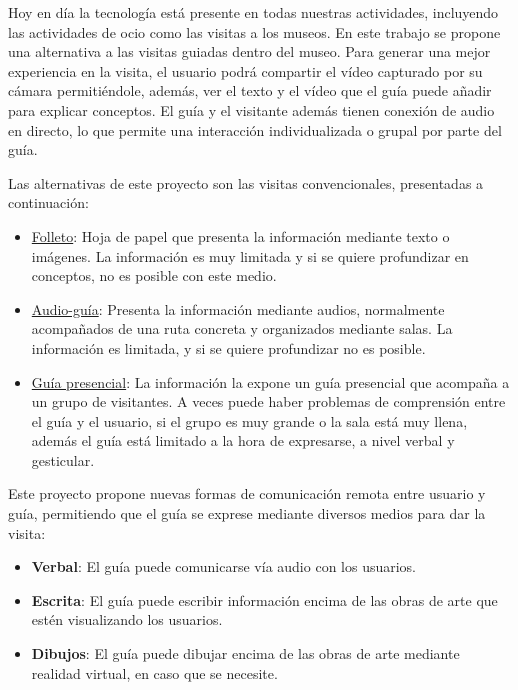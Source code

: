 

Hoy en día la tecnología está presente en todas nuestras actividades, incluyendo las actividades de ocio como las visitas a los museos. En este trabajo se propone una alternativa a las visitas guiadas dentro del museo. Para generar una mejor experiencia en la visita, el usuario podrá compartir el vídeo capturado por su cámara permitiéndole, además, ver el texto y el vídeo que el guía puede añadir para explicar conceptos. El guía y el visitante además tienen conexión de audio en directo, lo que permite una interacción individualizada o grupal por parte del guía.

Las alternativas de este proyecto son las visitas convencionales, presentadas a continuación:
\begin{itemize}
    \item \underline{Folleto}: Hoja de papel que presenta la información mediante texto o imágenes. La información es muy limitada y si se quiere profundizar en conceptos, no es posible con este medio.
    \item \underline{Audio-guía}: Presenta la información mediante audios, normalmente acompañados de una ruta concreta y organizados mediante salas. La información es limitada, y si se quiere profundizar no es posible.
    \item \underline{Guía presencial}: La información la expone un guía presencial que acompaña a un grupo de visitantes. A veces puede haber problemas de comprensión entre el guía y el usuario, si el grupo es muy grande o la sala está muy llena, además el guía está limitado a la hora de expresarse, a nivel verbal y gesticular.
\end{itemize}

Este proyecto propone nuevas formas de comunicación remota entre usuario y guía, permitiendo que el guía se exprese mediante diversos medios para dar la visita:
\begin{itemize}
    \item \textbf{Verbal}: El guía puede comunicarse vía audio con los usuarios.
    \item \textbf{Escrita}: El guía puede escribir información encima de las obras de arte que estén visualizando los usuarios.
    \item \textbf{Dibujos}: El guía puede dibujar encima de las obras de arte mediante realidad virtual, en caso que se necesite.
\end{itemize}

